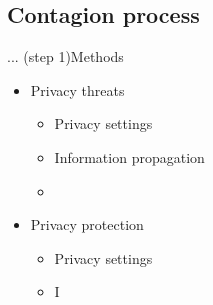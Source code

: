 \subsection{Contagion process}
\begin{frame}{... (step 1)}{Methods}
	\begin{itemize}
		\item Privacy threats
			\begin{itemize}
				\item Privacy settings
				\item Information propagation
				\item 
			\end{itemize}
		\item Privacy protection
			\begin{itemize}
				\item Privacy settings
				\item I
			\end{itemize}
	\end{itemize}
	

\end{frame}
